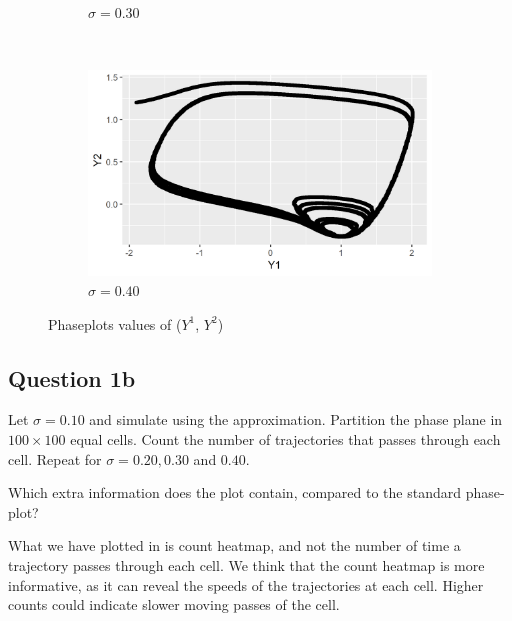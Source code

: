 \documentclass[a4paper]{article}
\begin{document}
\begin{figure}[ht!]
\begin{subfigure}[b]{0.45\textwidth}
        \caption{$\sigma = 0.30$}
    \end{subfigure}
    ~
    \begin{subfigure}[b]{0.45\textwidth}
        \includegraphics[width=\textwidth]{part1a-sigma4-Y1Y2.png}
        \caption{$\sigma = 0.40$}
    \end{subfigure}
    \caption{Phaseplots values of ($Y^1$, $Y^2$)}\label{fig:part1a-grid}
\end{figure}

\clearpage

\subsection{Question 1b}
Let $\sigma = 0.10$ and simulate using the approximation. Partition the phase plane in $100 \times 100$ equal cells. Count
the number of trajectories that passes through each cell. Repeat for $\sigma = 0.20, 0.30$ and $0.40$.

Which extra information does the plot contain, compared to the standard
phase-plot?

What we have plotted in  is count heatmap, and not
the number of time a trajectory passes through each cell. We think that 
the count heatmap is more informative, as it can reveal the speeds of the
trajectories at each cell. Higher counts could indicate slower moving passes of the cell.
\end{document}

